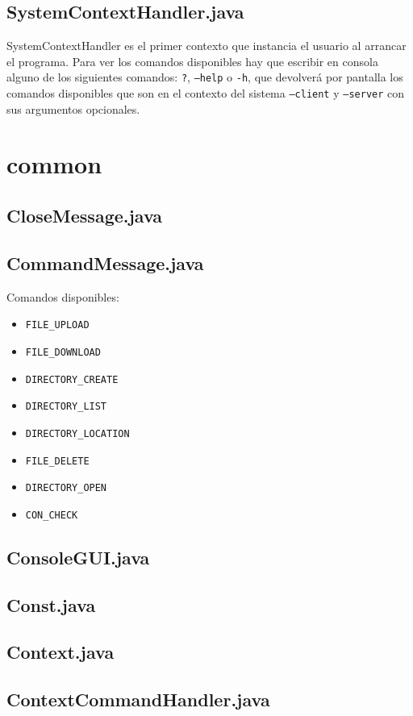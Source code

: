 \documentclass[a4paper, 12pt]{report}
\begin{document}
\section{SystemContextHandler.java}
SystemContextHandler es el primer contexto que instancia el usuario al arrancar el programa. 
Para ver los comandos disponibles hay que escribir en consola alguno de los siguientes comandos: 
\texttt{?}, \texttt{--help} o \texttt{-h}, que devolverá por pantalla los comandos disponibles que son 
en el contexto del sistema \texttt{--client} y \texttt{--server} con sus argumentos opcionales.


\chapter{common}
\section{CloseMessage.java}
\section{CommandMessage.java}

Comandos disponibles:

\begin{itemize}
	\item \texttt{FILE\_UPLOAD}
	\item \texttt{FILE\_DOWNLOAD}
	\item \texttt{DIRECTORY\_CREATE}
	\item \texttt{DIRECTORY\_LIST}
	\item \texttt{DIRECTORY\_LOCATION}
	\item \texttt{FILE\_DELETE}
	\item \texttt{DIRECTORY\_OPEN}
	\item \texttt{CON\_CHECK}
\end{itemize}

\section{ConsoleGUI.java}
\cite{console-output-to-textarea}
\section{Const.java}
\section{Context.java}
\section{ContextCommandHandler.java}
\end{document}
